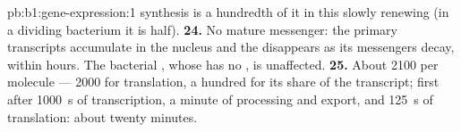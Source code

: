 \begin{solution}{pb:b1:gene-expression:1}
synthesis is a hundredth of it in this slowly renewing  (in a
dividing bacterium it is half).
\textbf{24.} No mature messenger: the primary transcripts accumulate
in the nucleus and the  disappears as its messengers decay,
within hours. The bacterial , whose  has no , is
unaffected.
\textbf{25.} About 2100  per molecule --- 2000 for translation, a
hundred for its share of the transcript; first  after
\qty{1000}{s} of transcription, a minute of processing and export,
and \qty{125}{s} of translation: about twenty minutes.
\end{solution}
